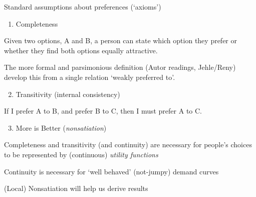 \documentclass[table]{beamer}
\providecommand{\tightlist}{%
  \setlength{\itemsep}{0pt}\setlength{\parskip}{0pt}}
\begin{document}
\begin{frame}{Standard assumptions about preferences (`axioms')}
\protect\hypertarget{standard-assumptions-about-preferences-axioms}{}

\begin{enumerate}
\tightlist
\item
  Completeness
\end{enumerate}

Given two options, A and B, a person can state which option they prefer
or whether they find both options equally attractive.

The more formal and parsimonious definition (Autor readings, Jehle/Reny)
develop this from a single relation `weakly preferred to'.

\begin{enumerate}
\setcounter{enumi}{1}
\tightlist
\item
  Transitivity (internal consistency)
\end{enumerate}

If I prefer A to B, and prefer B to C, then I must prefer A to C.

\begin{enumerate}
\setcounter{enumi}{2}
\tightlist
\item
  More is Better (\emph{nonsatiation})
\end{enumerate}

Completeness and transitivity (and continuity) are necessary for
people's choices to be represented by (continuous) \emph{utility
functions}

Continuity is necessary for `well behaved' (not-jumpy) demand curves

(Local) Nonsatiation will help us derive results

\end{frame}
\end{document}
